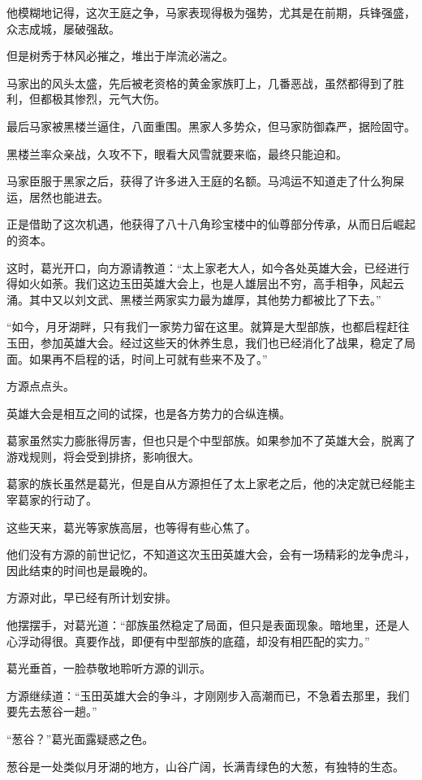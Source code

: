 \begin{this_body}
他模糊地记得，这次王庭之争，马家表现得极为强势，尤其是在前期，兵锋强盛，众志成城，屡破强敌。

但是树秀于林风必摧之，堆出于岸流必湍之。

马家出的风头太盛，先后被老资格的黄金家族盯上，几番恶战，虽然都得到了胜利，但都极其惨烈，元气大伤。

最后马家被黑楼兰逼住，八面重围。黑家人多势众，但马家防御森严，据险固守。

黑楼兰率众亲战，久攻不下，眼看大风雪就要来临，最终只能迫和。

马家臣服于黑家之后，获得了许多进入王庭的名额。马鸿运不知道走了什么狗屎运，居然也能进去。

正是借助了这次机遇，他获得了八十八角珍宝楼中的仙尊部分传承，从而日后崛起的资本。

这时，葛光开口，向方源请教道：“太上家老大人，如今各处英雄大会，已经进行得如火如荼。我们这边玉田英雄大会上，也是人雄层出不穷，高手相争，风起云涌。其中又以刘文武、黑楼兰两家实力最为雄厚，其他势力都被比了下去。”

“如今，月牙湖畔，只有我们一家势力留在这里。就算是大型部族，也都启程赶往玉田，参加英雄大会。经过这些天的休养生息，我们也已经消化了战果，稳定了局面。如果再不启程的话，时间上可就有些来不及了。”

方源点点头。

英雄大会是相互之间的试探，也是各方势力的合纵连横。

葛家虽然实力膨胀得厉害，但也只是个中型部族。如果参加不了英雄大会，脱离了游戏规则，将会受到排挤，影响很大。

葛家的族长虽然是葛光，但是自从方源担任了太上家老之后，他的决定就已经能主宰葛家的行动了。

这些天来，葛光等家族高层，也等得有些心焦了。

他们没有方源的前世记忆，不知道这次玉田英雄大会，会有一场精彩的龙争虎斗，因此结束的时间也是最晚的。

方源对此，早已经有所计划安排。

他摆摆手，对葛光道：“部族虽然稳定了局面，但只是表面现象。暗地里，还是人心浮动得很。真要作战，即便有中型部族的底蕴，却没有相匹配的实力。”

葛光垂首，一脸恭敬地聆听方源的训示。

方源继续道：“玉田英雄大会的争斗，才刚刚步入高潮而已，不急着去那里，我们要先去葱谷一趟。”

“葱谷？”葛光面露疑惑之色。

葱谷是一处类似月牙湖的地方，山谷广阔，长满青绿色的大葱，有独特的生态。


\end{this_body}
